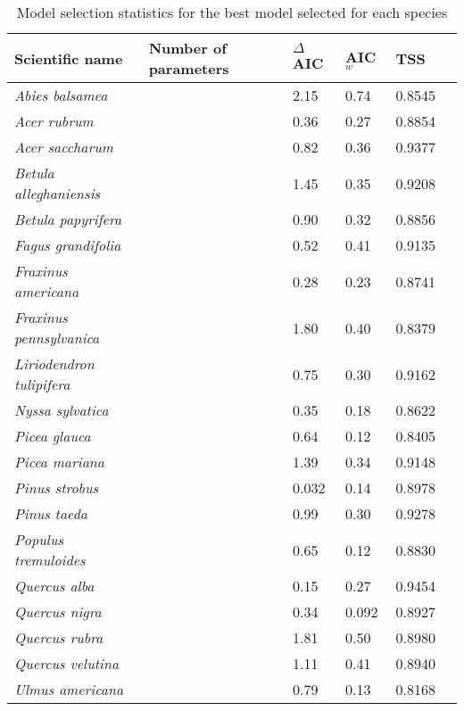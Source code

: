 \begin{table}[tb]
\begin{threeparttable}
\label{tab:model_selection}
\caption{Model selection statistics for the best model selected for each species}
\begin{tabular}{llllll}
\toprule
Scientific name    & Number of parameters & $\Delta$AIC\tnote{1} & AIC$_w$\tnote{2} & TSS\tnote{2} \\ 
\midrule
{\it Abies balsamea}          &   & 2.15      & 0.74   & 0.8545  \\
{\it Acer rubrum}             &   & 0.36      & 0.27   & 0.8854  \\
{\it Acer saccharum}          &   & 0.82      & 0.36   & 0.9377  \\
{\it Betula alleghaniensis}   &   & 1.45      & 0.35   & 0.9208  \\
{\it Betula papyrifera}       &   & 0.90      & 0.32   & 0.8856  \\
{\it Fagus grandifolia}       &   & 0.52      & 0.41   & 0.9135  \\
{\it Fraxinus americana}      &   & 0.28      & 0.23   & 0.8741  \\
{\it Fraxinus pennsylvanica}  &   & 1.80      & 0.40   & 0.8379  \\
{\it Liriodendron tulipifera} &   & 0.75      & 0.30   & 0.9162  \\
{\it Nyssa sylvatica}         &   & 0.35      & 0.18   & 0.8622  \\
{\it Picea glauca}            &   & 0.64      & 0.12   & 0.8405  \\
{\it Picea mariana}           &   & 1.39      & 0.34   & 0.9148  \\
{\it Pinus strobus}           &   & 0.032     & 0.14   & 0.8978  \\
{\it Pinus taeda}             &   & 0.99      & 0.30   & 0.9278  \\
{\it Populus tremuloides}     &   & 0.65      & 0.12   & 0.8830  \\ 
{\it Quercus alba}            &   & 0.15      & 0.27   & 0.9454  \\
{\it Quercus nigra}           &   & 0.34      & 0.092  & 0.8927  \\
{\it Quercus rubra}           &   & 1.81      & 0.50   & 0.8980  \\
{\it Quercus velutina}        &   & 1.11      & 0.41   & 0.8940  \\
{\it Ulmus americana}         &   & 0.79      & 0.13   & 0.8168  \\ 

\end{tabular}
\end{threeparttable}
\end{table}
